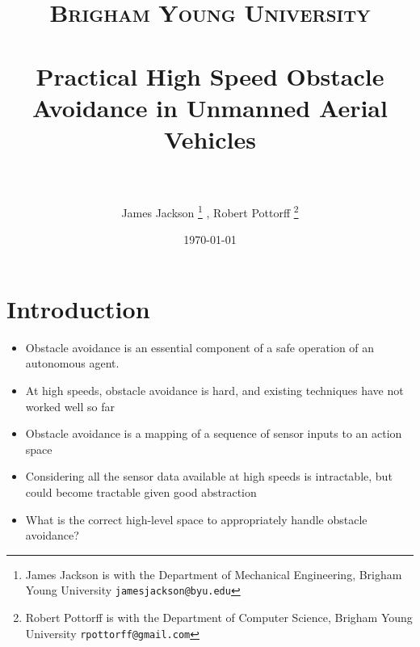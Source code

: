 \documentclass[paper=a4, fontsize=11pt]{scrartcl} %
\title{
\normalfont \normalsize
\textsc{Brigham Young University} \\ [25pt] %
\horrule{0.5pt} \\[0.4cm] %
\huge Practical High Speed Obstacle Avoidance in Unmanned Aerial Vehicles\\ %
\horrule{2pt} \\[0.5cm] %
}
\author{James Jackson%
\thanks{James Jackson is with the Department of Mechanical Engineering, Brigham Young University
        {\tt\small jamesjackson@byu.edu}}%
        , Robert Pottorff
\thanks{Robert Pottorff is with the Department of Computer Science, Brigham Young University
        {\tt\small rpottorff@gmail.com}}%
}
\date{\normalsize\today} %
\begin{document}
\maketitle %


\section{Introduction}

\begin{itemize}
	\item Obstacle avoidance is an essential component of a safe operation of an autonomous agent.
	\item At high speeds, obstacle avoidance is hard, and existing techniques have not worked well so far
\end{itemize}
	
\begin{itemize}
	\item Obstacle avoidance is a mapping of a sequence of sensor inputs to an action space
	\item Considering all the sensor data available at high speeds is intractable, but could become tractable given good abstraction
	\item What is the correct high-level space to appropriately handle obstacle avoidance?
\end{itemize}
	
\end{document}
